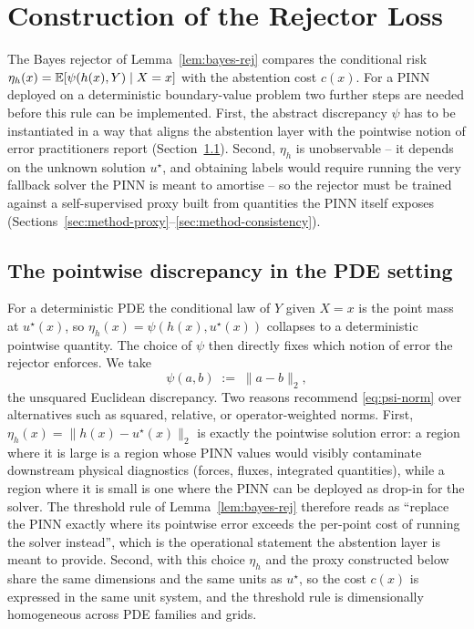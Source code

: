 \section{Construction of the Rejector Loss}
\label{sec:method}

The Bayes rejector of Lemma~\ref{lem:bayes-rej} compares the conditional
risk $\eta_h(x)=\mathbb{E}[\psi(h(x),Y)\mid X=x]$ with the abstention cost $c(x)$.
For a PINN deployed on a deterministic boundary-value problem two further
steps are needed before this rule can be implemented. First, the abstract
discrepancy $\psi$ has to be instantiated in a way that aligns the
abstention layer with the pointwise notion of error practitioners report
(Section~\ref{sec:method-psi}). Second, $\eta_h$ is unobservable -- it
depends on the unknown solution $u^\star$, and obtaining labels would
require running the very fallback solver the PINN is meant to amortise --
so the rejector must be trained against a self-supervised proxy built
from quantities the PINN itself exposes
(Sections~\ref{sec:method-proxy}--\ref{sec:method-consistency}).

\subsection{The pointwise discrepancy in the PDE setting}
\label{sec:method-psi}

For a deterministic PDE the conditional law of $Y$ given $X=x$ is the
point mass at $u^\star(x)$, so $\eta_h(x)=\psi(h(x),u^\star(x))$ collapses
to a deterministic pointwise quantity. The choice of $\psi$ then directly
fixes which notion of error the rejector enforces. We take
\begin{equation}
  \psi(a,b)\;:=\;\|a-b\|_2,
  \label{eq:psi-norm}
\end{equation}
the unsquared Euclidean discrepancy. Two reasons recommend
\eqref{eq:psi-norm} over alternatives such as squared, relative, or
operator-weighted norms. First, $\eta_h(x)=\|h(x)-u^\star(x)\|_2$ is
exactly the pointwise solution error: a region where it is large is a
region whose PINN values would visibly contaminate downstream physical
diagnostics (forces, fluxes, integrated quantities), while a region where
it is small is one where the PINN can be deployed as drop-in for the
solver. The threshold rule of Lemma~\ref{lem:bayes-rej} therefore reads as
``replace the PINN exactly where its pointwise error exceeds the per-point
cost of running the solver instead'', which is the operational statement
the abstention layer is meant to provide. Second, with this choice $\eta_h$
and the proxy constructed below share the same dimensions and the same
units as $u^\star$, so the cost $c(x)$ is expressed in the same unit
system, and the threshold rule is dimensionally homogeneous across PDE
families and grids.

